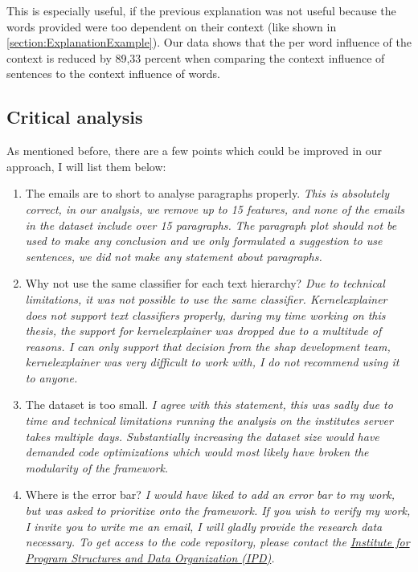This is especially useful, if the previous explanation was not useful because the words provided were too dependent on their context (like shown in \autoref{section:ExplanationExample}). Our data shows that the per word influence of the context is reduced by 89,33 percent when comparing the context influence of sentences to the context influence of words.

\subsection{Critical analysis}
\label{sec:critique}

As mentioned before, there are a few points which could be improved in our approach, I will list them below:

\begin{enumerate}
    \item The emails are to short to analyse paragraphs properly. \textit{This is absolutely correct, in our analysis, we remove up to 15 features, and none of the emails in the dataset include over 15 paragraphs. The paragraph plot should not be used to make any conclusion and we only formulated a suggestion to use sentences, we did not make any statement about paragraphs.}
    \item Why not use the same classifier for each text hierarchy? \textit{Due to technical limitations, it was not possible to use the same classifier. \textit{Kernelexplainer} does not support text classifiers properly, during my time working on this thesis, the support for kernelexplainer was dropped due to a multitude of reasons. I can only support that decision from the shap development team, kernelexplainer was very difficult to work with, I do not recommend using it to anyone.}
    \item The dataset is too small. \textit{I agree with this statement, this was sadly due to time and technical limitations running the analysis on the institutes server takes multiple days. Substantially increasing the dataset size would have demanded code optimizations which would most likely have broken the modularity of the framework.}
    \item Where is the error bar? \textit{I would have liked to add an error bar to my work, but was asked to prioritize onto the framework. If you wish to verify my work, I invite you to write me an email, I will gladly provide the research data necessary. To get access to the code repository, please contact the \href{https://dbis.ipd.kit.edu/english/index.php}{Institute for Program Structures and Data Organization (IPD)}.}
\end{enumerate}